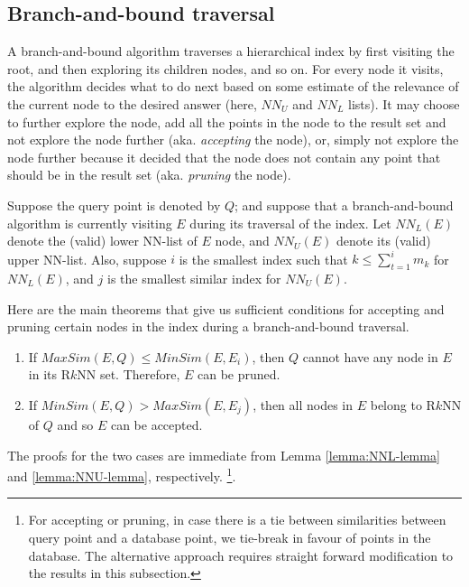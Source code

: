 \documentclass[prodmode,letterpaper]{acmsmall}
\newcommand{\rknn}{R$k$NN\xspace}
\begin{document}
\subsection{Branch-and-bound traversal}
A branch-and-bound algorithm traverses a hierarchical index by first visiting
the root, and then exploring its children nodes, and so on. For every node it
visits, the algorithm decides what to do next based on some estimate of the
relevance of the current node to the desired answer (here, $NN_U$ and $NN_L$
lists). It may choose to further explore the node, add all the points
in the node to the result set and not explore the node further (aka. {\em
accepting} the node), or, simply not explore the node further because it decided
that the node does not contain any point that should be in the result set (aka.
{\em pruning} the node).

Suppose the query point is denoted by $Q$; and suppose that a branch-and-bound
algorithm is currently visiting $E$ during its traversal of the
index. Let $NN_L(E)$ denote the (valid) lower NN-list of $E$
node, and $NN_U(E)$ denote its (valid) upper NN-list. Also, suppose $i$ is the smallest
index such that $k \le \sum_{t=1}^{i} m_k$ for $NN_L(E)$, and 
$j$ is the smallest similar index for $NN_U(E)$.

Here are the main theorems that give us sufficient conditions for accepting and
pruning certain nodes in the index during a branch-and-bound traversal.

\begin{theorem}\label{thm:accept-prune-condition}
\begin{enumerate}
    \item If $MaxSim(E,Q) \leq MinSim(E,E_i)$, then $Q$ cannot have any node in $E$ in
its \rknn set. Therefore, $E$ can be pruned.
    \item If $MinSim(E,Q) > MaxSim(E,E_j)$, then all nodes in $E$ belong to \rknn of $Q$
and so $E$ can be accepted.
\end{enumerate}
\end{theorem}
The proofs for the two cases are immediate from
Lemma \ref{lemma:NNL-lemma} and \ref{lemma:NNU-lemma}, respectively.
\footnote{For accepting or pruning, in case there is a tie between
similarities between query point and a database point, we tie-break in favour of points in the database. The alternative
approach requires straight forward modification to the results in this
subsection.}.
\end{document}

